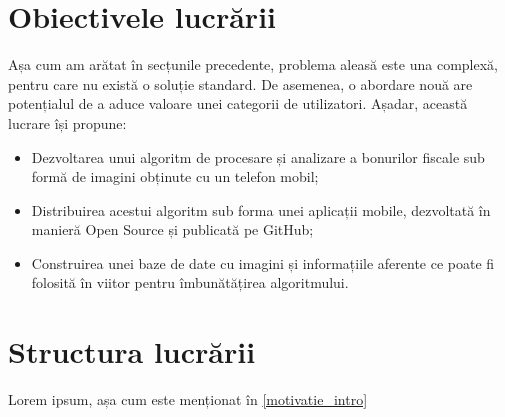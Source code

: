 \section{Obiectivele lucrării}\label{obiective_intro}

Așa cum am arătat în secțunile precedente, problema aleasă este una complexă, pentru care nu există o soluție standard. De asemenea, o abordare nouă are potențialul de a aduce valoare unei categorii de utilizatori. Așadar, această lucrare își propune:

\begin{itemize}
    \item 
    Dezvoltarea unui algoritm de procesare și analizare a bonurilor fiscale sub formă de imagini obținute cu un telefon mobil;
    \item
    Distribuirea acestui algoritm sub forma unei aplicații mobile, dezvoltată în manieră Open Source și publicată pe GitHub;
    \item
    Construirea unei baze de date cu imagini și informațiile aferente ce poate fi folosită în viitor pentru îmbunătățirea algoritmului.
\end{itemize}

\section{Structura lucrării}\label{structura_intro}

Lorem ipsum, așa cum este menționat în \ref{motivatie_intro}
